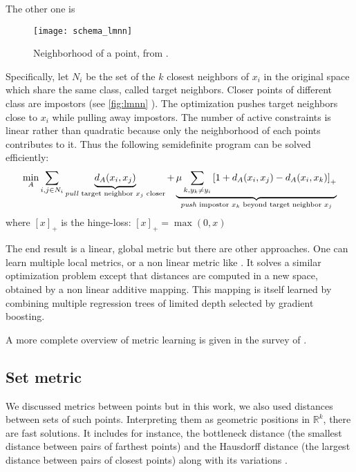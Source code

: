 The other one is  \autocite{LMNN09}
\begin{figure}[ht]
	\texttt{[image: schema\_lmnn]}
	\caption{Neighborhood of a point, from \autocite{LMNN09}.\label{fig:lmnn}}
\end{figure}
Specifically, let $N_i$ be the set of the $k$ closest neighbors of $x_i$ in the
original space which share the same class, called target neighbors. Closer
points of different class are impostors (see \autoref{fig:lmnn}
). The optimization pushes target neighbors close to $x_i$
while pulling away impostors. The number of active constraints is linear
rather than quadratic because only the neighborhood of each points contributes
to it. Thus the following semidefinite program can be solved efficiently:
\begin{equation*}
	\min_A \sum_{i, j\in N_i}
	\underbrace{d_A(x_i, x_j)}_\text{\emph{pull} target neighbor $x_j$ closer} +
	\underbrace{\mu \sum_{k, y_k\neq y_i} \left[ 1 + d_A(x_i, x_j) -
	d_A(x_i, x_k)\right]_+}_\text{\emph{push} impostor $x_k$ beyond target
	neighbor $x_j$}
\end{equation*}
where $[x]_+$ is the hinge-loss: $[x]_+=\max(0, x)$

The end result is a linear, global metric but there are other approaches. One
can learn multiple local metrics, or a non linear metric like
 \autocite{GBLMNN12}. It solves a similar
optimization problem except that distances are computed in a new space,
obtained by a non linear additive mapping. This mapping is itself learned by
combining multiple regression trees of limited depth selected by gradient
boosting.

A more complete overview of metric learning is given in the survey of
\textcite{MetricSurvey13}.

\subsection{Set metric}

We discussed metrics between points but in this work, we also used distances
between sets of such points. Interpreting them as geometric positions in
$\mathbb{R}^k$, there are fast solutions. It includes for instance, the
bottleneck distance \autocite{Bottleneck96} (the smallest distance between
pairs of farthest points) and the Hausdorff distance (the largest distance
between pairs of closest points) along with its variations
\autocite{ModifiedHausdorff94}.

